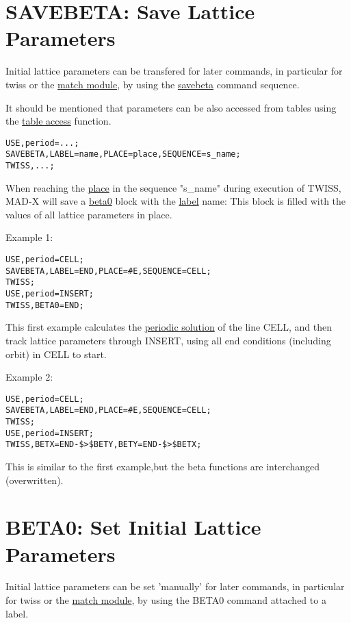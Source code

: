 \section{SAVEBETA: Save Lattice Parameters}

Initial lattice parameters can be transfered for later commands, in
particular for twiss or the \href{../match/match.html}{match module}, by
using the \href{../control/general.html#savebeta}{savebeta} command
sequence.  

It should be mentioned that parameters can be also accessed from tables
using the \href{../Introduction/expression.html#table}{table access}
function. 
\begin{verbatim}
USE,period=...;
SAVEBETA,LABEL=name,PLACE=place,SEQUENCE=s_name;
TWISS,...;
\end{verbatim}

When reaching the \href{../control/general.html#place}{place} in the
sequence "s\_name" during execution of TWISS, MAD-X will save a
\hyperlink{beta0}{beta0} block with the
\href{../Introduction/label.html}{label} name: This block is filled with
the values of all lattice parameters in place.  

Example 1: 
\begin{verbatim}
USE,period=CELL;
SAVEBETA,LABEL=END,PLACE=#E,SEQUENCE=CELL;
TWISS;
USE,period=INSERT;
TWISS,BETA0=END;
\end{verbatim}

This first example calculates the \hyperlink{periodic}{periodic
  solution} of the line CELL, and then track lattice parameters through
INSERT, using all end conditions (including orbit) in CELL to start.  

Example 2: 
\begin{verbatim}
USE,period=CELL;
SAVEBETA,LABEL=END,PLACE=#E,SEQUENCE=CELL;
TWISS;
USE,period=INSERT;
TWISS,BETX=END-$>$BETY,BETY=END-$>$BETX;
\end{verbatim}

This is similar to the first example,but the beta functions are interchanged (overwritten).  

\section{BETA0: Set Initial Lattice Parameters}

Initial lattice parameters can be set 'manually' for later commands, in
particular for twiss or the \href{../match/match.html}{match module}, by
using the BETA0 command attached to a label.  

